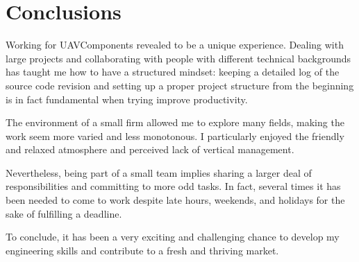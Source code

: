 \section{Conclusions}
Working for UAVComponents revealed to be a unique experience.
Dealing with large projects and collaborating with people with different technical backgrounds has taught me how to have a structured mindset: keeping a detailed log of the source code revision and setting up a proper project structure from the beginning is in fact fundamental when trying improve productivity.

The environment of a small firm allowed me to explore many fields, making the work seem more varied and less monotonous.
I particularly enjoyed the friendly and relaxed atmosphere and perceived lack of vertical management.

Nevertheless, being part of a small team implies sharing a larger deal of responsibilities and committing to more odd tasks.
In fact, several times it has been needed to come to work despite late hours, weekends, and holidays for the sake of fulfilling a deadline.

To conclude, it has been a very exciting and challenging chance to develop my engineering skills and contribute to a fresh and thriving market.